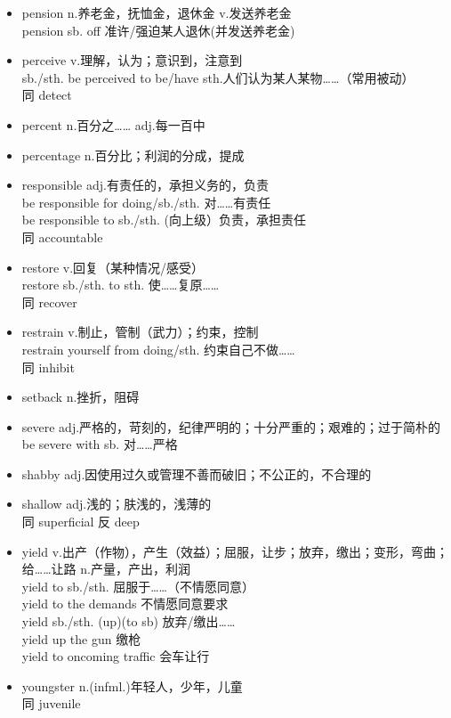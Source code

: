\documentclass[11pt,a4paper,UTF8,titlepage]{ctexrep} %
\begin{document}
\begin{multicols}{2}
\begin{itemize}
        \item pension n.养老金，抚恤金，退休金 v.发送养老金\\pension sb. off 准许/强迫某人退休(并发送养老金)
        \item perceive v.理解，认为；意识到，注意到\\sb./sth. be perceived to be/have sth.人们认为某人某物……（常用被动）\\同 detect
        \item percent n.百分之…… adj.每一百中
        \item percentage n.百分比；利润的分成，提成
        \item responsible adj.有责任的，承担义务的，负责\\be responsible for doing/sb./sth. 对……有责任\\be responsible to sb./sth. (向上级）负责，承担责任\\同 accountable
        \item restore v.回复（某种情况/感受）\\restore sb./sth. to sth. 使……复原……\\同 recover
        \item restrain v.制止，管制（武力）；约束，控制\\restrain yourself from doing/sth. 约束自己不做……\\同 inhibit
        \item setback n.挫折，阻碍
        \item severe adj.严格的，苛刻的，纪律严明的；十分严重的；艰难的；过于简朴的\\be severe with sb. 对……严格
        \item shabby adj.因使用过久或管理不善而破旧；不公正的，不合理的
        \item shallow adj.浅的；肤浅的，浅薄的\\同 superficial 反 deep
        \item yield v.出产（作物），产生（效益）；屈服，让步；放弃，缴出；变形，弯曲；给……让路 n.产量，产出，利润\\yield to sb./sth. 屈服于……（不情愿同意）\\yield to the demands 不情愿同意要求\\yield sb./sth. (up)(to sb) 放弃/缴出……\\yield up the gun 缴枪\\yield to oncoming traffic 会车让行
        \item youngster n.(infml.)年轻人，少年，儿童\\同 juvenile
    \end{itemize}
    \end{multicols}
\end{document}
